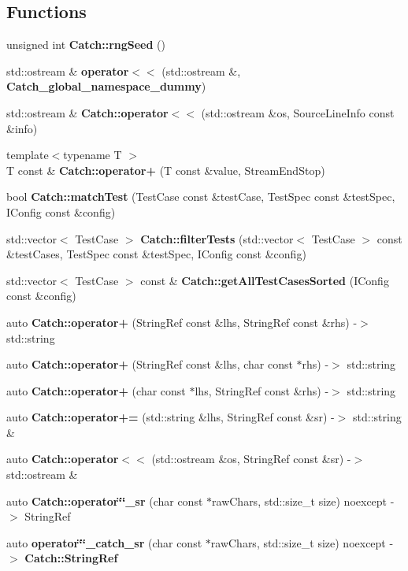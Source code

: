\subsection*{Functions}
\begin{DoxyCompactItemize}
\item 
unsigned int \textbf{ Catch\+::rng\+Seed} ()
\item 
std\+::ostream \& \textbf{ operator$<$$<$} (std\+::ostream \&, \textbf{ Catch\+\_\+global\+\_\+namespace\+\_\+dummy})
\item 
std\+::ostream \& \textbf{ Catch\+::operator$<$$<$} (std\+::ostream \&os, Source\+Line\+Info const \&info)
\item 
{\footnotesize template$<$typename T $>$ }\\T const  \& \textbf{ Catch\+::operator+} (T const \&value, Stream\+End\+Stop)
\item 
bool \textbf{ Catch\+::match\+Test} (Test\+Case const \&test\+Case, Test\+Spec const \&test\+Spec, I\+Config const \&config)
\item 
std\+::vector$<$ Test\+Case $>$ \textbf{ Catch\+::filter\+Tests} (std\+::vector$<$ Test\+Case $>$ const \&test\+Cases, Test\+Spec const \&test\+Spec, I\+Config const \&config)
\item 
std\+::vector$<$ Test\+Case $>$ const  \& \textbf{ Catch\+::get\+All\+Test\+Cases\+Sorted} (I\+Config const \&config)
\item 
auto \textbf{ Catch\+::operator+} (String\+Ref const \&lhs, String\+Ref const \&rhs) -\/$>$ std\+::string
\item 
auto \textbf{ Catch\+::operator+} (String\+Ref const \&lhs, char const $\ast$rhs) -\/$>$ std\+::string
\item 
auto \textbf{ Catch\+::operator+} (char const $\ast$lhs, String\+Ref const \&rhs) -\/$>$ std\+::string
\item 
auto \textbf{ Catch\+::operator+=} (std\+::string \&lhs, String\+Ref const \&sr) -\/$>$ std\+::string \&
\item 
auto \textbf{ Catch\+::operator$<$$<$} (std\+::ostream \&os, String\+Ref const \&sr) -\/$>$ std\+::ostream \&
\item 
auto \textbf{ Catch\+::operator\char`\"{}\char`\"{}\+\_\+sr} (char const $\ast$raw\+Chars, std\+::size\+\_\+t size) noexcept -\/$>$ String\+Ref
\item 
auto \textbf{ operator\char`\"{}\char`\"{}\+\_\+catch\+\_\+sr} (char const $\ast$raw\+Chars, std\+::size\+\_\+t size) noexcept -\/$>$ \textbf{ Catch\+::\+String\+Ref}
\item 

\end{DoxyCompactItemize}

